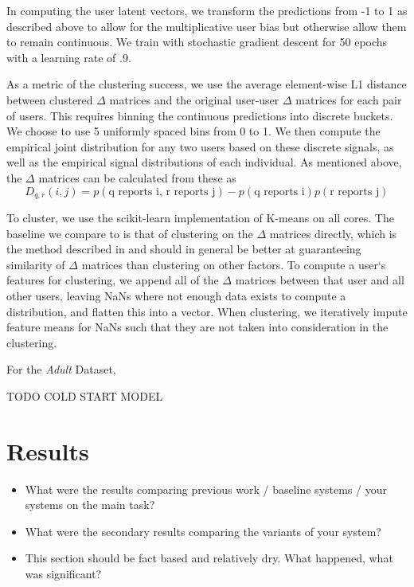 \documentclass{article}
\begin{document}
In computing the user latent vectors, we transform the predictions from -1 to 1 as described above to allow for the multiplicative user bias but otherwise allow them to remain continuous. We train with stochastic gradient descent for 50 epochs with a learning rate of .9. 

As a metric of the clustering success, we use the average element-wise L1 distance between clustered $\Delta$ matrices and the original user-user $\Delta$ matrices for each pair of users. This requires binning the continuous predictions into discrete buckets. We choose to use 5 uniformly spaced bins from 0 to 1. We then compute the empirical joint distribution for any two users based on these discrete signals, as well as the empirical signal distributions of each individual. As mentioned above, the $\Delta$ matrices can be calculated from these as 
$$D_{q,r}(i,j) = p(\textrm{q reports i, r reports j}) - p(\textrm{q reports i})p(\textrm{r reports j})$$

To cluster, we use the scikit-learn implementation of K-means on all cores. The baseline we compare to is that of clustering on the $\Delta$ matrices directly, which is the method described in \citet{agarwal2017} and should in general be better at guaranteeing similarity of $\Delta$ matrices than clustering on other factors. To compute a user`s features for clustering, we append all of the $\Delta$ matrices between that user and all other users, leaving NaNs where not enough data exists to compute a distribution, and flatten this into a vector. When clustering, we iteratively impute feature means for NaNs such that they are not taken into consideration in the clustering. 

For the \emph{Adult} Dataset, 

TODO COLD START MODEL

\section{Results}

\begin{itemize}
\item What were the results comparing previous work / baseline systems / your systems on the main task?
\item What were the secondary results comparing the variants of your system?
\item This section should be fact based and relatively dry. What happened, what was significant?
\end{itemize}
\end{document}
